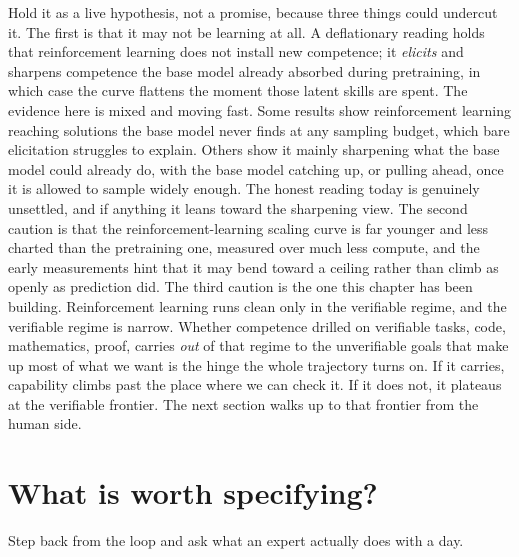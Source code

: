 Hold it as a live hypothesis, not a promise, because three things could undercut it. The first is that it may not be learning at all. A deflationary reading holds that reinforcement learning does not install new competence; it \emph{elicits} and sharpens competence the base model already absorbed during pretraining, in which case the curve flattens the moment those latent skills are spent. The evidence here is mixed and moving fast. Some results show reinforcement learning reaching solutions the base model never finds at any sampling budget, which bare elicitation struggles to explain. Others show it mainly sharpening what the base model could already do, with the base model catching up, or pulling ahead, once it is allowed to sample widely enough. The honest reading today is genuinely unsettled, and if anything it leans toward the sharpening view. The second caution is that the reinforcement-learning scaling curve is far younger and less charted than the pretraining one, measured over much less compute, and the early measurements hint that it may bend toward a ceiling rather than climb as openly as prediction did. The third caution is the one this chapter has been building. Reinforcement learning runs clean only in the verifiable regime, and the verifiable regime is narrow. Whether competence drilled on verifiable tasks, code, mathematics, proof, carries \emph{out} of that regime to the unverifiable goals that make up most of what we want is the hinge the whole trajectory turns on. If it carries, capability climbs past the place where we can check it. If it does not, it plateaus at the verifiable frontier. The next section walks up to that frontier from the human side.

\section*{What is worth specifying?}

Step back from the loop and ask what an expert actually does with a day.

